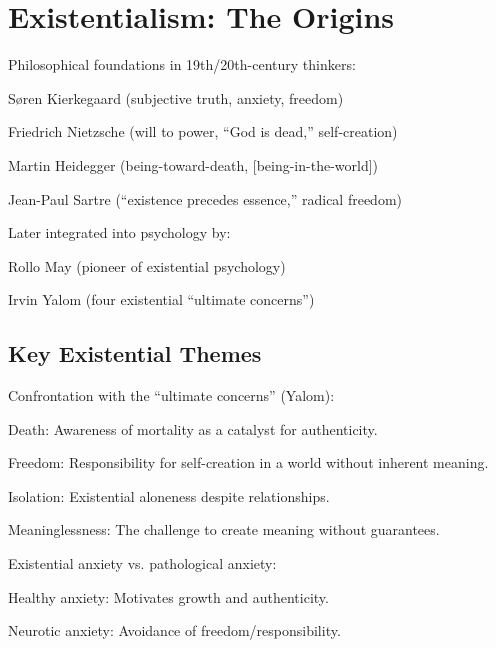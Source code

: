 \section{Existentialism: The Origins}
\begin{coloredlist}
    \item Philosophical foundations in 19th/20th-century thinkers:
    \begin{coloredlist}
        \item Søren Kierkegaard (subjective truth, anxiety, freedom)
        \item Friedrich Nietzsche (will to power, ``God is dead,'' self-creation)
        \item Martin Heidegger (being-toward-death,  [being-in-the-world])
        \item Jean-Paul Sartre (``existence precedes essence,'' radical freedom)
    \end{coloredlist}
    \item Later integrated into psychology by:
    \begin{coloredlist}
        \item Rollo May (pioneer of existential psychology)
        \item Irvin Yalom (four existential ``ultimate concerns'')
    \end{coloredlist}
\end{coloredlist}

\subsection{Key Existential Themes}
\begin{coloredlist}
    \item Confrontation with the ``ultimate concerns'' (Yalom):
    \begin{coloredlist}
        \item Death: Awareness of mortality as a catalyst for authenticity.
        \item Freedom: Responsibility for self-creation in a world without inherent meaning.
        \item Isolation: Existential aloneness despite relationships.
        \item Meaninglessness: The challenge to create meaning without guarantees.
    \end{coloredlist}
    \item Existential anxiety vs. pathological anxiety:
    \begin{coloredlist}
        \item Healthy anxiety: Motivates growth and authenticity.
        \item Neurotic anxiety: Avoidance of freedom/responsibility.
    \end{coloredlist}
\end{coloredlist}

